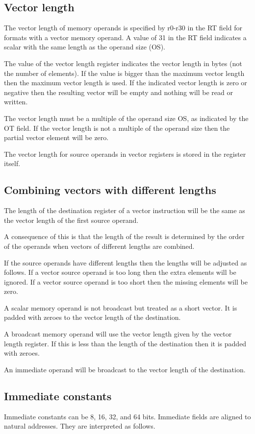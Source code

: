 \documentclass[forwardcom.tex]{subfiles}
\begin{document}
\subsection{Vector length}
The vector length of memory operands is specified by r0-r30 in the RT field for formats with a vector memory operand. A value of 31 in the RT field indicates a scalar with the same length as the operand size (OS).
\vv

The value of the vector length register indicates the vector length in bytes (not the number of elements). If the value is bigger than the maximum vector length then the maximum vector length is used. 
If the indicated vector length is zero or negative then the resulting vector will be empty and nothing will be read or written.
\vv

The vector length must be a multiple of the operand size OS, as indicated by the OT field. If the vector length is not a multiple of the operand size then the partial vector element will be zero.
\vv

The vector length for source operands in vector registers is stored in the register itself.

\subsection{Combining vectors with different lengths}
The length of the destination register of a vector instruction will be the same as the vector length of the first source operand.
\vv

A consequence of this is that the length of the result is determined by the order of the operands when vectors of different lengths are combined.
\vv

If the source operands have different lengths then the lengths will be adjusted as follows. If a vector source operand is too long then the extra elements will be ignored. If a vector source operand is too short then the missing elements will be zero.
\vv

A scalar memory operand is not broadcast but treated as a short vector. It is padded with zeroes to the vector length of the destination.
\vv

A broadcast memory operand will use the vector length given by the vector length register. If this is less than the length of the destination then it is padded with zeroes.
\vv

An immediate operand will be broadcast to the vector length of the destination.
\vv

\subsection{Immediate constants}
Immediate constants can be 8, 16, 32, and 64 bits. Immediate fields are aligned to natural addresses. They are interpreted as follows.
\vv
\end{document}
